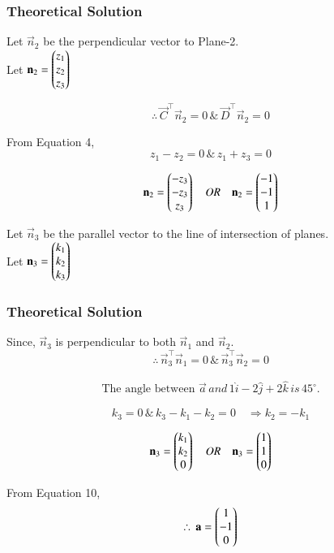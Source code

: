 \documentclass{beamer}
\begin{document}
\begin{frame}[fragile]
\frametitle{Theoretical Solution}
Let $\vec{n}_2$ be the perpendicular vector to Plane-2.\\
Let $\mathbf{n}_2 = \begin{pmatrix}z_1 \\ z_2 \\ z_3\end{pmatrix}$

\begin{equation}
\therefore \, \vec{C}^\top\vec{n}_2=0 \, \& \, \vec{D}^\top\vec{n}_2=0
\end{equation}

From Equation 4,
\begin{equation}
z_1 - z_2 =0 \, \& \, z_1 + z_3 = 0
\end{equation}

\begin{equation}
    \mathbf{n}_2 = \begin{pmatrix}-z_3 \\ -z_3 \\ z_3\end{pmatrix} \quad OR \quad \mathbf{n}_2 = \begin{pmatrix}-1 \\ -1 \\ 1\end{pmatrix}
\end{equation}


Let $\vec{n}_3$ be the parallel vector to the line of intersection of planes.\\
Let $\mathbf{n}_3 = \begin{pmatrix}k_1 \\ k_2 \\ k_3\end{pmatrix}$
\end{frame}

\begin{frame}[fragile]
\frametitle{Theoretical Solution}
Since, $\vec{n}_3$ is perpendicular to both $\vec{n}_1$ and $\vec{n}_2$.
\begin{equation}
    \therefore \, \vec{n}_3^\top\vec{n}_1=0 \, \& \, \vec{n}_3^\top\vec{n}_2 =0
\end{equation}


\begin{align}
  \boxed{\text{The angle between } \vec{a} \, and \, 1\hat{i} -2\hat{j}+2\hat{k} \, is \, 45^{\circ}.}  
\end{align}
  
\begin{equation}
k_3 = 0 \, \& \, k_3 - k_1 - k_2 = 0 \quad \Rightarrow k_2 = -k_1
\end{equation}

\begin{equation}
\mathbf{n}_3 = \begin{pmatrix}k_1 \\ k_2 \\ 0\end{pmatrix} \quad OR \quad \mathbf{n}_3 = \begin{pmatrix}1 \\ 1 \\ 0\end{pmatrix}    
\end{equation}

From Equation 10,
\begin{equation}
\therefore \, \mathbf{a} = \begin{pmatrix}1 \\ -1 \\ 0\end{pmatrix}    
\end{equation}
\end{frame}
\end{document}
